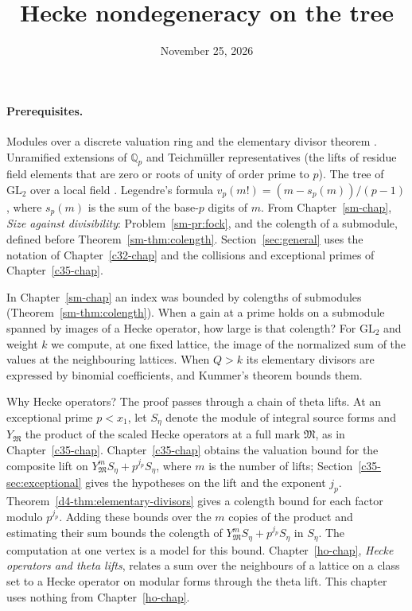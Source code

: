 \documentclass[reqno]{amsart}
\title{Hecke nondegeneracy on the tree}
\author{}
\date{November 25, 2026}
\newcounter{chap}
\theoremstyle{definition}
\theoremstyle{plain}
\newcommand{\Q}{\mathbb{Q}}
\newcommand{\GL}{\mathrm{GL}}
\begin{document}
\maketitle
{}\label{chap}

\paragraph{Prerequisites.}
Modules over a discrete valuation ring and the elementary divisor theorem \cite[Ch.~III, \S7]{La}.  Unramified extensions of \(\Q_p\) and Teichm\"uller representatives (the lifts of residue field elements that are zero or roots of unity of order prime to \(p\)).  The tree of \(\GL_2\) over a local field \cite[Ch.~II, \S1]{SeT}.  Legendre's formula \(v_p(m!) = (m - s_p(m))/(p-1)\), where \(s_p(m)\) is the sum of the base-\(p\) digits of \(m\).  From Chapter~\ref{sm-chap}, \emph{Size against divisibility}: Problem~\ref{sm-pr:fock}, and the colength of a submodule, defined before Theorem~\ref{sm-thm:colength}.  Section~\ref{sec:general} uses the notation of Chapter~\ref{c32-chap} and the collisions and exceptional primes of Chapter~\ref{c35-chap}.

In Chapter~\ref{sm-chap} an index was bounded by colengths of submodules (Theorem~\ref{sm-thm:colength}).  When a gain at a prime holds on a submodule spanned by images of a Hecke operator, how large is that colength?  For \(\GL_2\) and weight \(k\) we compute, at one fixed lattice, the image of the normalized sum of the values at the neighbouring lattices.  When \(Q > k\) its elementary divisors are expressed by binomial coefficients, and Kummer's theorem bounds them.

Why Hecke operators?  The proof passes through a chain of theta lifts.  At an exceptional prime \(p < x_1\), let \(S_\eta\) denote the module of integral source forms and \(Y_{\mathfrak M}\) the product of the scaled Hecke operators at a full mark \(\mathfrak M\), as in Chapter~\ref{c35-chap}.  Chapter~\ref{c35-chap} obtains the valuation bound for the composite lift on \(Y_{\mathfrak M}^m S_\eta + p^{j_p} S_\eta\), where \(m\) is the number of lifts; Section~\ref{c35-sec:exceptional} gives the hypotheses on the lift and the exponent \(j_p\).  Theorem~\ref{d4-thm:elementary-divisors} gives a colength bound for each factor modulo \(p^{j_p}\).  Adding these bounds over the \(m\) copies of the product and estimating their sum bounds the colength of \(Y_{\mathfrak M}^m S_\eta + p^{j_p} S_\eta\) in \(S_\eta\).  The computation at one vertex is a model for this bound.  Chapter~\ref{ho-chap}, \emph{Hecke operators and theta lifts}, relates a sum over the neighbours of a lattice on a class set to a Hecke operator on modular forms through the theta lift.  This chapter uses nothing from Chapter~\ref{ho-chap}.
\end{document}
